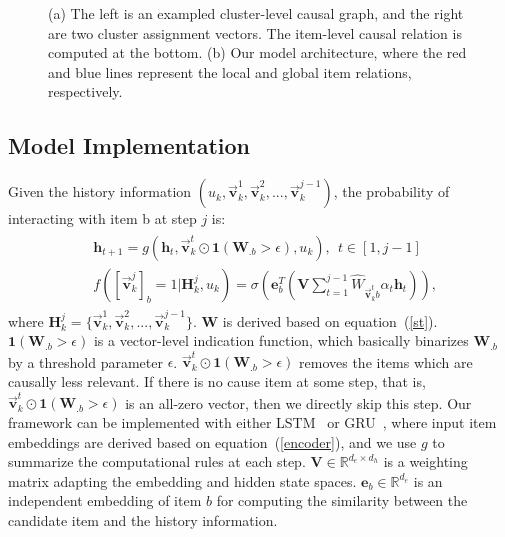 \documentclass[conference]{IEEEtran}
\theoremstyle{definition}
\theoremstyle{theorem}
\theoremstyle{proof}
\theoremstyle{remark}
\begin{document}
\begin{figure}[t]
	\centering
	\setlength{\fboxrule}{0.pt}
	\setlength{\fboxsep}{0.pt}
	\vspace*{-0.2cm}
	\caption{
		(a) The left is an exampled cluster-level causal graph, and the right are two cluster assignment vectors.
		The item-level causal relation is computed at the bottom. 
		(b) Our model architecture, where the red and blue lines represent the local and global item relations, respectively.
	}
	\label{model}
	\vspace*{-0.cm}
\end{figure}


\subsection{Model Implementation}
Given the history information $(u_k,\vec{\bm{v}}_k^1,\vec{\bm{v}}_k^2,...,\vec{\bm{v}}_k^{j-1})$, the probability of interacting with item b at step $j$ is:
	\begin{eqnarray}\label{cx}
		\begin{aligned}
			&\bm{h}_{t+1} = g (\bm{h}_{t}, \vec{\bm{v}}_k^{t}\odot\bm{1}(\bm{W}_{.b}>\epsilon),u_k),~~t\in[1,j-1]\\
			&f([\vec{\bm{v}}_k^{j}]_b=1|\bm{H}_{k}^j, {u}_k)  = \sigma{(\bm{e}_b^T (\bm{V}\sum_{t=1}^{j-1} \hat{{W}}_{\vec{\bm{v}}_k^{t}b}\alpha_t \bm{h}_t))},
		\end{aligned}
	\end{eqnarray}
where $\bm{H}_{k}^j = \{\vec{\bm{v}}_k^1,\vec{\bm{v}}_k^2,...,\vec{\bm{v}}_k^{j-1}\}$. 
$\bm{W}$ is derived based on equation~(\ref{st}).
$\bm{1}(\bm{W}_{.b}>\epsilon)$ is a vector-level indication function, which basically binarizes $\bm{W}_{.b}$ by a threshold parameter $\epsilon$.
$\vec{\bm{v}}_k^{t}\odot\bm{1}(\bm{W}_{.b}>\epsilon)$ removes the items which are causally less relevant.
If there is no cause item at some step, that is, $\vec{\bm{v}}_k^{t}\odot\bm{1}(\bm{W}_{.b}>\epsilon)$ is an all-zero vector, then we directly skip this step.
Our framework can be implemented with either LSTM~\cite{hochreiter1997long} or GRU~\cite{chung2014empirical}, where input item embeddings are derived based on equation~(\ref{encoder}), and we use $g$ to summarize the computational rules at each step.
$\bm{V}\in \mathbb{R}^{d_e\times d_h}$ is a weighting matrix adapting the embedding and hidden state spaces.
$\bm{e}_b\in \mathbb{R}^{d_e}$ is an independent embedding of item $b$ for computing the similarity between the candidate item and the history information.
\end{document}
